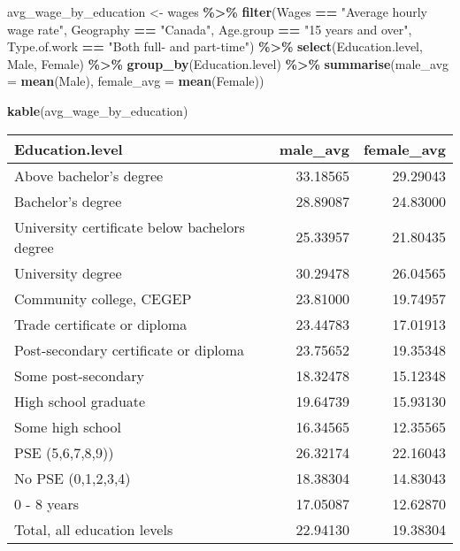 \documentclass[
]{article}
\newenvironment{Shaded}{\begin{snugshade}}{\end{snugshade}}
\newcommand{\AttributeTok}[1]{\textcolor[rgb]{0.13,0.29,0.53}{#1}}
\newcommand{\FunctionTok}[1]{\textcolor[rgb]{0.13,0.29,0.53}{\textbf{#1}}}
\newcommand{\NormalTok}[1]{#1}
\newcommand{\OtherTok}[1]{\textcolor[rgb]{0.56,0.35,0.01}{#1}}
\newcommand{\SpecialCharTok}[1]{\textcolor[rgb]{0.81,0.36,0.00}{\textbf{#1}}}
\newcommand{\StringTok}[1]{\textcolor[rgb]{0.31,0.60,0.02}{#1}}
\begin{document}
\begin{Shaded}
\begin{Highlighting}[]
\NormalTok{avg\_wage\_by\_education }\OtherTok{\textless{}{-}}\NormalTok{ wages }\SpecialCharTok{\%\textgreater{}\%}
  \FunctionTok{filter}\NormalTok{(Wages }\SpecialCharTok{==} \StringTok{"Average hourly wage rate"}\NormalTok{, }
\NormalTok{         Geography }\SpecialCharTok{==} \StringTok{"Canada"}\NormalTok{,}
\NormalTok{         Age.group }\SpecialCharTok{==} \StringTok{"15 years and over"}\NormalTok{,}
\NormalTok{         Type.of.work }\SpecialCharTok{==} \StringTok{"Both full{-} and part{-}time"}\NormalTok{) }\SpecialCharTok{\%\textgreater{}\%}
  \FunctionTok{select}\NormalTok{(Education.level, Male, Female) }\SpecialCharTok{\%\textgreater{}\%}
  \FunctionTok{group\_by}\NormalTok{(Education.level) }\SpecialCharTok{\%\textgreater{}\%}
  \FunctionTok{summarise}\NormalTok{(}\AttributeTok{male\_avg =} \FunctionTok{mean}\NormalTok{(Male),}
            \AttributeTok{female\_avg =} \FunctionTok{mean}\NormalTok{(Female))}

\FunctionTok{kable}\NormalTok{(avg\_wage\_by\_education)}
\end{Highlighting}
\end{Shaded}

\begin{longtable}[]{@{}lrr@{}}
\toprule\noalign{}
Education.level & male\_avg & female\_avg \\
\midrule\noalign{}
\endhead
\bottomrule\noalign{}
\endlastfoot
Above bachelor's degree & 33.18565 & 29.29043 \\
Bachelor's degree & 28.89087 & 24.83000 \\
University certificate below bachelors degree & 25.33957 & 21.80435 \\
University degree & 30.29478 & 26.04565 \\
Community college, CEGEP & 23.81000 & 19.74957 \\
Trade certificate or diploma & 23.44783 & 17.01913 \\
Post-secondary certificate or diploma & 23.75652 & 19.35348 \\
Some post-secondary & 18.32478 & 15.12348 \\
High school graduate & 19.64739 & 15.93130 \\
Some high school & 16.34565 & 12.35565 \\
PSE (5,6,7,8,9)) & 26.32174 & 22.16043 \\
No PSE (0,1,2,3,4) & 18.38304 & 14.83043 \\
0 - 8 years & 17.05087 & 12.62870 \\
Total, all education levels & 22.94130 & 19.38304 \\
\end{longtable}
\end{document}
